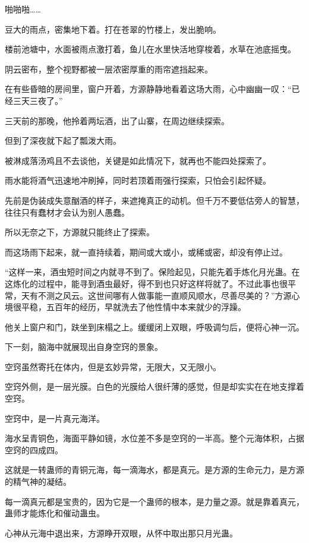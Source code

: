 
\begin{this_body}

啪啪啪……

豆大的雨点，密集地下着。打在苍翠的竹楼上，发出脆响。

楼前池塘中，水面被雨点激打着，鱼儿在水里快活地穿梭着，水草在池底摇曳。

阴云密布，整个视野都被一层浓密厚重的雨帘遮挡起来。

在有些昏暗的房间里，窗户开着，方源静静地看着这场大雨，心中幽幽一叹：“已经三天三夜了。”

三天前的那晚，他拎着两坛酒，出了山寨，在周边继续探索。

但到了深夜就下起了瓢泼大雨。

被淋成落汤鸡且不去谈他，关键是如此情况下，就再也不能四处探索了。

雨水能将酒气迅速地冲刷掉，同时若顶着雨强行探索，只怕会引起怀疑。

先前是伪装成失意酗酒的样子，来遮掩真正的动机。但千万不要低估旁人的智慧，往往只有蠢材才会认为别人愚蠢。

所以无奈之下，方源就只能终止了探索。

而这场雨下起来，就一直持续着，期间或大或小，或稀或密，却没有停止过。

“这样一来，酒虫短时间之内就寻不到了。保险起见，只能先着手炼化月光蛊。在这炼化的过程中，能寻到酒虫最好，得不到也只好这样将就了。不过此事也很平常，天有不测之风云。这世间哪有人做事能一直顺风顺水，尽善尽美的？”方源心境很平稳，五百年的经历，早就洗去了他性情中本来就少的浮躁。

他关上窗户和门，趺坐到床榻之上。缓缓闭上双眼，呼吸调匀后，便将心神一沉。

下一刻，脑海中就展现出自身空窍的景象。

空窍虽然寄托在体内，但是玄妙异常，无限大，又无限小。

空窍外侧，是一层光膜。白色的光膜给人很纤薄的感觉，但是却实实在在地支撑着空窍。

空窍中，是一片真元海洋。

海水呈青铜色，海面平静如镜，水位差不多是空窍的一半高。整个元海体积，占据空窍的四成四。

这就是一转蛊师的青铜元海，每一滴海水，都是真元。是方源的生命元力，是方源的精气神的凝结。

每一滴真元都是宝贵的，因为它是一个蛊师的根本，是力量之源。就是靠着真元，蛊师才能炼化和催动蛊虫。

心神从元海中退出来，方源睁开双眼，从怀中取出那只月光蛊。


\end{this_body}
